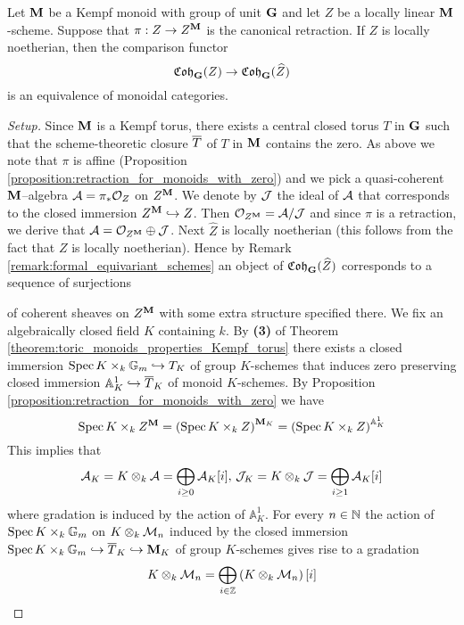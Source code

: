 \begin{theorem}
Let $\mathbf{M}$ be a Kempf monoid with group of unit $\mathbf{G}$ and let $Z$ be a locally linear $\mathbf{M}$-scheme. Suppose that $\pi:Z\rightarrow Z^{\mathbf{M}}$ is the canonical retraction. If $Z$ is locally noetherian, then the comparison functor
$$\mathfrak{Coh}_{\mathbf{G}}(Z)\rightarrow \mathfrak{Coh}_{\mathbf{G}}(\widehat{Z})$$
is an equivalence of monoidal categories.
\end{theorem}
\begin{proof}[Setup]
Since $\mathbf{M}$ is a Kempf torus, there exists a central closed torus $T$ in $\mathbf{G}$ such that the scheme-theoretic closure $\overline{T}$ of $T$ in $\mathbf{M}$ contains the zero. As above we note that $\pi$ is affine (Proposition \ref{proposition:retraction_for_monoids_with_zero}) and we pick a quasi-coherent $\mathbf{M}$--algebra ${\mathcal A} = \pi_*{\mathcal O}_Z$ on $Z^{\mathbf{M}}$. We denote by ${\mathcal J}$ the ideal of ${\mathcal A}$ that corresponds to the closed immersion $Z^{\mathbf{M}}\hookrightarrow Z$. Then ${\mathcal O}_{Z^{\mathbf{M}}} = {\mathcal A}/{\mathcal J}$ and since $\pi$ is a retraction, we derive that ${\mathcal A} = {\mathcal O}_{Z^{\mathbf{M}}}\oplus {\mathcal J}$. Next $\widehat{Z}$ is locally noetherian (this follows from the fact that $Z$ is locally noetherian). Hence by Remark \ref{remark:formal_equivariant_schemes} an object of $\mathfrak{Coh}_{\mathbf{G}}(\widehat{Z})$ corresponds to a sequence of surjections
\begin{center}
\end{center}
of coherent sheaves on $Z^{\mathbf{M}}$ with some extra structure specified there. We fix an algebraically closed field $K$ containing $k$. By \textbf{(3)} of Theorem \ref{theorem:toric_monoids_properties_Kempf_torus} there exists a closed immersion $\mathrm{Spec}\, K\times_k \mathbb{G}_m\hookrightarrow T_K$ of group $K$-schemes that induces zero preserving closed immersion $\mathbb{A}^1_K\hookrightarrow \overline{T}_K$ of monoid $K$-schemes. By Proposition \ref{proposition:retraction_for_monoids_with_zero} we have
$$\mathrm{Spec}\, K\times_k Z^{\mathbf{M}} = \left(\mathrm{Spec}\, K\times_k Z\right)^{\mathbf{M}_K} = \left(\mathrm{Spec}\, K\times_k Z\right)^{\mathbb{A}^1_K}$$
This implies that
$${\mathcal A}_K = K\otimes_k{\mathcal A} = \bigoplus_{i\geq 0}{\mathcal A}_K[i],\,{\mathcal J}_K = K\otimes_k{\mathcal J} = \bigoplus_{i\geq 1}{\mathcal A}_K[i]$$
where gradation is induced by the action of $\mathbb{A}^1_K$. For every $n\in {\mathbb N}$ the action of $\mathrm{Spec}\, K\times_k \mathbb{G}_m$ on $K\otimes_k{\mathcal M}_n$ induced by the closed immersion $\mathrm{Spec}\, K\times_k \mathbb{G}_m \hookrightarrow \overline{T}_K\hookrightarrow \mathbf{M}_K$ of group $K$-schemes gives rise to a gradation
$$K\otimes_k{\mathcal M}_n = \bigoplus_{i\in {\mathbb Z}}\left(K\otimes_k{\mathcal M}_n\right)[i]$$
\end{proof}

